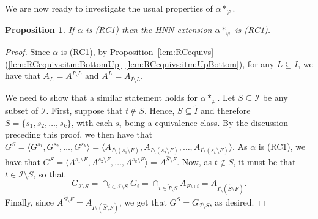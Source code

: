\documentclass[11pt,letterpaper]{amsart}
\newtheorem{prop}{Proposition}[section]
\newcommand{\II}{\mathcal{I}}
\begin{document}
We are now ready to investigate the usual properties of $\alpha *_\varphi$.


\begin{prop}\label{prop:HNNRC1}
    If $\alpha$ is (RC1) then  the HNN-extension $\alpha *_\varphi$ is (RC1).
\end{prop}
\begin{proof}
    Since $\alpha$ is (RC1), by Proposition~\ref{lem:RCequivs}(\ref{lem:RCequivs:itm:BottomUp}--\ref{lem:RCequivs:itm:UpBottom}), for any $L\subseteq I$, we have that $A_L = A^{I\setminus L}$ and $A^L = A_{I\setminus L}$.
    
    We need to show that a similar statement holds for $\alpha *_\varphi$. Let $S\subseteq \II$ be any subset of $\II$. 
    First, suppose that $t\notin S$. 
    Hence, $S\subseteq \widetilde{I}$ and therefore $S = \{s_1,s_2,\ldots,s_k\}$, with each $s_i$ being a equivalence class. By the discussion preceding this proof, we then have that $G^S = \langle G^{s_1}, G^{s_2},\ldots,G^{s_k}\rangle = \langle A_{I\setminus (s_1\setminus F)}, A_{I\setminus (s_2\setminus F)},\ldots,A_{I\setminus (s_k\setminus F)}\rangle$. As $\alpha$ is (RC1), we have that $G^S= \langle A^{s_1\setminus F}, A^{s_2\setminus F}, \ldots, A^{s_k\setminus F}\rangle = A^{\widehat{S}\setminus F}$. 
    Now, as $t\notin S$, it must be that $t\in \II\setminus S$, so that $$G_{\II\setminus S}=\cap_{i\in \II\setminus S} G_i = \cap_{i\in \widetilde{I}\setminus S} A_{F\cup i} =A_{I\setminus(\widehat{S}\setminus F)}.$$
    Finally, since $A^{\widehat{S}\setminus F} = A_{I\setminus (\widehat{S}\setminus F)}$, we get that $G^S = G_{\II\setminus S}$, as desired.


\end{proof}
\end{document}
